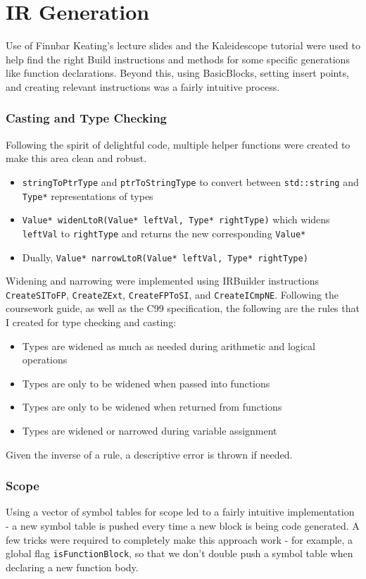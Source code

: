 \documentclass[10pt,a4paper]{article}
\newcommand{\code}[1]{\lstinline!#1!}
\begin{document}
\section*{IR Generation}
Use of Finnbar Keating's lecture slides and the Kaleidescope tutorial were used to help find the right Build instructions and methods for some specific generations like function declarations. Beyond this, using BasicBlocks, setting insert points, and creating relevant instructions was a fairly intuitive process.
\subsubsection*{Casting and Type Checking}
Following the spirit of delightful code, multiple helper functions were created to make this area clean and robust. 
\begin{itemize}
    \item \code{stringToPtrType} and \code{ptrToStringType} to convert between \code{std::string} and \code{Type*} representations of types
    \item \code{Value* widenLtoR(Value* leftVal, Type* rightType)} which widens \code{leftVal} to \code{rightType} and returns the new corresponding \code{Value*}
    \item Dually, \code{Value* narrowLtoR(Value* leftVal, Type* rightType)}
\end{itemize}
Widening and narrowing were implemented using IRBuilder instructions \code{CreateSIToFP}, \code{CreateZExt}, \code{CreateFPToSI}, and \code{CreateICmpNE}. Following the coursework guide, as well as the C99 specification, the following are the rules that I created for type checking and casting:
\begin{itemize}
    \item Types are widened as much as needed during arithmetic and logical operations
    \item Types are only to be widened when passed into functions
    \item Types are only to be widened when returned from functions
    \item Types are widened or narrowed during variable assignment
\end{itemize}
Given the inverse of a rule, a descriptive error is thrown if needed.
\subsubsection*{Scope}
Using a vector of symbol tables for scope led to a fairly intuitive implementation - a new symbol table is pushed every time a new block is being code generated. A few tricks were required to completely make this approach work - for example, a global flag \code{isFunctionBlock}, so that we don't double push a symbol table when declaring a new function body.
\end{document}
